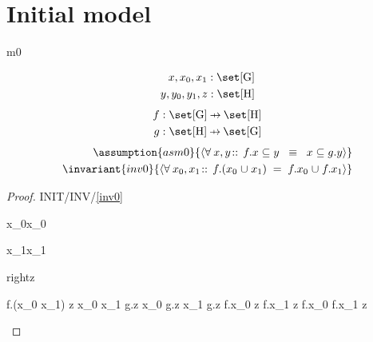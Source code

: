 \documentclass[12pt]{amsart}
\title{}
\author{}
\date{} %
\begin{document}
\maketitle
\tableofcontents

\newcommand{\G}{\text{G}}
\renewcommand{\H}{\text{H}}

\section{Initial model}
\begin{machine}{m0}

\newset{\G}
\newset{\H}


\begin{align*}
\dummy{x, x_0, x_1 : \set[\G]} \\
\dummy{y,y_0,y_1, z: \set[\H]}
\end{align*}
\begin{align*}
\constant{f : \set [\G] \pfun \set [\H]} \\
\constant{g : \set [\H] \pfun \set [\G]} \\
\end{align*}
\begin{align*}
\assumption{asm0}{ \qforall{x,y}{}{ f.x \subseteq y \2\equiv x \subseteq g.y } } \\
\invariant{inv0}{ \qforall{x_0,x_1}{}{ f.(x_0 \bunion x_1) \1 = f.x_0 \bunion f.x_1 } }
\end{align*}

\begin{proof}{INIT/INV/\ref{inv0}}
	\begin{free:var}{x_0}{x_0}
	\begin{free:var}{x_1}{x_1}
	\begin{indirect:equality}{right}{\subseteq}{z}
	\begin{calculation}
		f.(x_0 \bunion x_1) \1\subseteq z
	\hint{=}{ \eqref{asm0} }
		x_0 \bunion x_1 \1\subseteq g.z
		x_0 \subseteq g.z \2\land x_1 \subseteq g.z
	\hint{=}{ \eqref{asm0} }
		f.x_0 \subseteq z \2\land f.x_1 \subseteq z
		f.x_0 \bunion f.x_1 \1\subseteq z
	\end{calculation}
	\end{indirect:equality}
	\end{free:var}
	\end{free:var}
\end{proof}


\end{machine}
\end{document}
